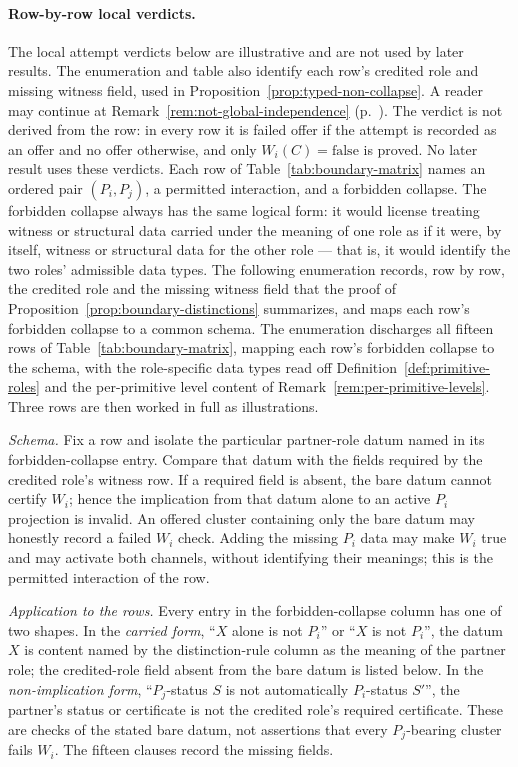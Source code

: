 \paragraph{Row-by-row local verdicts.} The local attempt verdicts below
are illustrative and are not used by later results. The enumeration and
table also identify each row's credited role and missing witness field,
used in Proposition~\ref{prop:typed-non-collapse}. A reader may continue
at Remark~\ref{rem:not-global-independence}
(p.~\pageref{rem:not-global-independence}). The verdict is not derived
from the row: in every row it is
failed offer if the attempt is recorded as an offer and no offer otherwise,
and only \(W_i(C)=\mathrm{false}\) is proved. No later result uses these
verdicts. Each row of Table~\ref{tab:boundary-matrix} names an
ordered pair \((P_i,P_j)\), a permitted interaction, and a forbidden
collapse. The forbidden collapse always has the same logical form: it would
license treating witness or structural data carried under the meaning of one
role as if it were, by itself, witness or structural data for the other role
--- that is, it would identify the two roles' admissible data types. The following
enumeration records, row by row, the credited role and the missing witness
field that the proof of Proposition~\ref{prop:boundary-distinctions}
summarizes, and maps each row's forbidden collapse to a common schema. The
enumeration discharges
all fifteen rows of Table~\ref{tab:boundary-matrix}, mapping each row's
forbidden collapse to the schema, with the role-specific data types read off
Definition~\ref{def:primitive-roles} and the per-primitive level content of
Remark~\ref{rem:per-primitive-levels}. Three rows are then worked in full as
illustrations.

\emph{Schema.} Fix a row and isolate the particular partner-role datum named
in its forbidden-collapse entry. Compare that datum with the fields required
by the credited role's witness row. If a required field is absent, the bare
datum cannot certify \(W_i\); hence the implication from that datum alone to
an active \(P_i\) projection is invalid. An offered cluster containing only the
bare datum may honestly record a failed \(W_i\) check. Adding the missing
\(P_i\) data may make \(W_i\) true and may activate both channels, without
identifying their meanings; this is the permitted interaction of the row.

\emph{Application to the rows.} Every entry in the forbidden-collapse column
has one of two shapes. In the \emph{carried form}, ``\(X\) alone is not
\(P_i\)'' or ``\(X\) is not \(P_i\)'', the datum \(X\) is content named by the
distinction-rule column as the meaning of the partner role; the credited-role
field absent from the bare datum is listed below. In the
\emph{non-implication form}, ``\(P_j\)-status \(S\) is not automatically
\(P_i\)-status \(S'\)'', the partner's status or certificate is not the
credited role's required certificate. These are checks of the stated bare
datum, not assertions that every \(P_j\)-bearing cluster fails \(W_i\). The
fifteen clauses record the missing fields.

